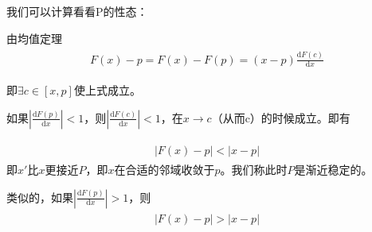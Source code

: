我们可以计算看看P的性态：

由均值定理
\begin{align*}
	\begin{split}
	\label{eq:feedforward}
	F(x)-p=F(x)-F(p)=(x-p)\frac{\mathrm{d} F(c)}{\mathrm{d} x}
\end{split}
\end{align*}

即\begin{math}\exists c\in [x,p]\end{math}使上式成立。

如果\begin{math}\left | \frac{\mathrm{d} F(p)}{\mathrm{d} x} \right |<1\end{math}，则\begin{math}\left | \frac{\mathrm{d} F(c)}{\mathrm{d} x} \right |<1\end{math}，在\begin{math}x\rightarrow c\end{math}（从而c）的时候成立。即有

\begin{align*}
	\begin{split}
	\label{eq:feedforward}
	\left | F(x)-p \right |<\left | x-p \right |
\end{split}
\end{align*}
即\begin{math}x'\end{math}比\begin{math}x\end{math}更接近\begin{math}P\end{math}，即\begin{math}x\end{math}在合适的邻域收敛于\begin{math}p\end{math}。我们称此时\begin{math}P\end{math}是渐近稳定的。

类似的，如果\begin{math}\left | \frac{\mathrm{d} F(p)}{\mathrm{d} x} \right |>1\end{math}，则
	\begin{align*}
		\begin{split}
		\label{eq:feedforward}
		\left | F(x)-p \right |>\left | x-p \right |
	\end{split}
	\end{align*}


